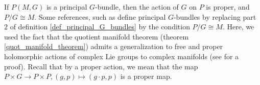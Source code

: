 \begin{obs} \label{action_principal_G_bundle}
    If \(P(M,G)\) is a principal \(G\)-bundle, then the action of \(G\) on \(P\) is proper, and \(P/G \cong M\). Some references, such as \parencite{kobayashi_vol1} define principal \(G\)-bundles by replacing part \(2\) of definition \ref{def_principal_G_bundles} by the condition \(P/G \cong M\). Here, we used the fact that the quotient manifold theorem (theorem \ref{quot_manifold_theorem}) admits a generalization to free and proper holomorphic actions of complex Lie groups to complex manifolds (see \parencite[Lemma 3.2.6, page 334]{schneider1999several} for a proof). Recall that by a proper action, we mean that the map \(P \times G \to P \times P, (g,p)\mapsto (g\cdot p, p)\) is a proper map. %
\end{obs}


